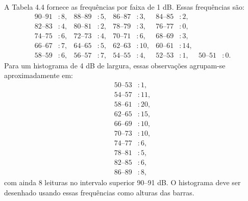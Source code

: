 A Tabela 4.4 fornece as frequências por faixa de 1 dB. Essas frequências são:
\begin{align*}
90\text{–}91 &: 8, & 88\text{–}89 &: 5, & 86\text{–}87 &: 3, & 84\text{–}85 &: 2,\\
82\text{–}83 &: 4, & 80\text{–}81 &: 2, & 78\text{–}79 &: 3, & 76\text{–}77 &: 0,\\
74\text{–}75 &: 6, & 72\text{–}73 &: 4, & 70\text{–}71 &: 6, & 68\text{–}69 &: 3,\\
66\text{–}67 &: 7, & 64\text{–}65 &: 5, & 62\text{–}63 &: 10, & 60\text{–}61 &: 14,\\
58\text{–}59 &: 6, & 56\text{–}57 &: 7, & 54\text{–}55 &: 4, & 52\text{–}53 &: 1, & 50\text{–}51 &: 0.
\end{align*}
Para um histograma de 4 dB de largura, essas observações agrupam-se aproximadamente em:
\begin{align*}
50\text{–}53 &: 1,\\
54\text{–}57 &: 11,\\
58\text{–}61 &: 20,\\
62\text{–}65 &: 15,\\
66\text{–}69 &: 10,\\
70\text{–}73 &: 10,\\
74\text{–}77 &: 6,\\
78\text{–}81 &: 5,\\
82\text{–}85 &: 6,\\
86\text{–}89 &: 8,
\end{align*}
com ainda 8 leituras no intervalo superior 90–91 dB. O histograma deve ser desenhado usando essas frequências como alturas das barras.  